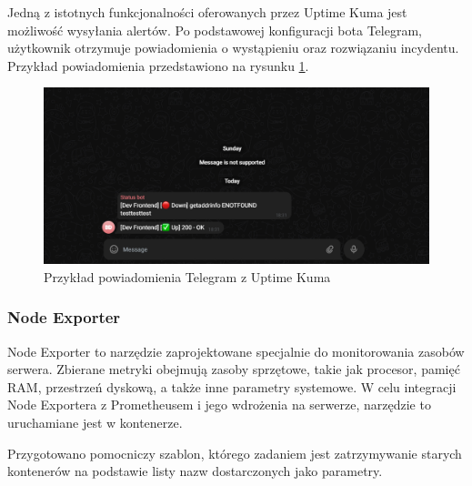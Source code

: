 \documentclass{article}
\begin{document}
Jedną z istotnych funkcjonalności oferowanych przez Uptime Kuma jest możliwość wysyłania alertów. Po podstawowej konfiguracji bota Telegram, użytkownik otrzymuje powiadomienia o wystąpieniu oraz rozwiązaniu incydentu. Przykład powiadomienia przedstawiono na rysunku \ref{fig:telegram-alert}.

\begin{figure}[H]
    \centering
    \includegraphics[width=1\linewidth]{uptimeKumaTelegram.png}
    \caption{Przykład powiadomienia Telegram z Uptime Kuma}
    \label{fig:telegram-alert}
\end{figure}

\subsubsection{Node Exporter}

Node Exporter to narzędzie zaprojektowane specjalnie do monitorowania zasobów serwera. Zbierane metryki obejmują zasoby sprzętowe, takie jak procesor, pamięć RAM, przestrzeń dyskową, a także inne parametry systemowe. W celu integracji Node Exportera z Prometheusem i jego wdrożenia na serwerze, narzędzie to uruchamiane jest w kontenerze.

Przygotowano pomocniczy szablon, którego zadaniem jest zatrzymywanie starych kontenerów na podstawie listy nazw dostarczonych jako parametry.
\end{document}
